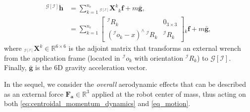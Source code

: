 \begin{equation}\label{eq:centroidal_momentum_dynamics}
	\begin{split}
		{}^{\mathcal{G}[\mathcal{I}]}  \dot{\boldsymbol{h}} &= \sum_{k = 1}^{n_c} {}_{{}^{\mathcal{G}[\mathcal{I}]}}\boldsymbol{X}^k {}_k\textbf{f} + m \bar{\boldsymbol{g}}, \\
		&= \sum_{k = 1}^{n_c} \begin{bmatrix}
			{}^{\mathcal{I}}R_k & 0_{3\times 3} \\
			({}^{\mathcal{I}}o_k - x)^\wedge\,{}^{\mathcal{I}}R_k & {}^{\mathcal{I}}R_k
		\end{bmatrix} {}_k\textbf{f} + m \bar{\boldsymbol{g}}, 
	\end{split}
\end{equation}
where ${}_{{}^{\mathcal{G}[\mathcal{I}]}}\boldsymbol{X}^k \in \mathbb{R}^{6 \times 6}$ is the adjoint matrix that transforms an external wrench from the application frame (located in ${}^{\mathcal{I}}o_k$ with orientation ${}^{\mathcal{I}}R_k$) to ${\mathcal{G}[\mathcal{I}]}$. Finally, $\bar{\boldsymbol{g}}$ is the 6D gravity acceleration vector.

In the sequel, we consider the \emph{overall} aerodynamic effects that can be described as an external force $\boldsymbol{F_a} \in \mathbb{R}^3$ applied at the robot center of mass, thus acting on both  \eqref{eq:centroidal_momentum_dynamics} and \eqref{eq_motion}.